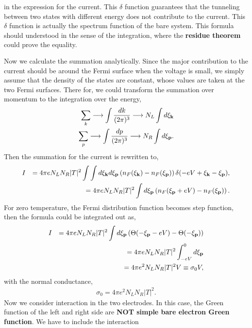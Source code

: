 \documentclass[11pt]{article}
\begin{document}
in the expression for the current. This \(\delta\) function guarantees
that the tunneling between two states with different energy does not
contribute to the current. This \(\delta\) function is actually the
spectrum function of the bare system. This formula should understood in
the sense of the integration, where the \textbf{residue theorem} could
prove the equality.

    Now we calculate the summation analytically. Since the major
contribution to the current should be around the Fermi surface when the
voltage is small, we simply assume that the density of the states are
constant, whose values are taken at the two Fermi surfaces. There for,
we could transform the summation over momentum to the integration over
the energy, \begin{eqnarray}
\sum_{k} \longrightarrow \int \frac{dk}{(2\pi)^3} \longrightarrow  N_L \int d \xi_{\bf k}
\\\nonumber
\sum_{p} \longrightarrow  \int \frac{dp}{(2\pi)^3} \longrightarrow  N_R \int d \xi_{\bf p}.
\end{eqnarray} Then the summation for the current is rewritten to,
\begin{eqnarray}
I && = 4 \pi e N_L N_R |T|^2  \int \int  d \xi_{\bf k} d \xi_{\bf p}    \left( n_F(\xi_{\bf k})- n_F(\xi_{\bf p}) \right)  \delta(-eV   +\xi_{\bf k} -\xi_{\bf p}),
\nonumber\\
&& = 4 \pi e N_L N_R |T|^2  \int d \xi_{\bf p}  \left( n_F(\xi_{\bf p} + eV)- n_F(\xi_{\bf p}) \right).
\end{eqnarray} For zero temperature, the Fermi distribution function
becomes step function, then the formula could be integrated out as,
\begin{eqnarray}
I && = 4 \pi e N_L N_R |T|^2  \int   d \xi_{\bf p}  \left( \Theta(-\xi_{\bf p} - eV) - \Theta (-\xi_{\bf p}) \right)
\\\nonumber
&& = 4 \pi e N_L N_R |T|^2  \int_{-eV}^0   d \xi_{\bf p} 
\\\nonumber
&& = 4 \pi e^2 N_L N_R |T|^2 V \equiv \sigma_0 V,
\end{eqnarray} with the normal conductance, \begin{eqnarray}
 \sigma_0 =4 \pi e^2 N_L N_R |T|^2.
\end{eqnarray} Now we consider interaction in the two electrodes. In
this case, the Green function of the left and right side are \textbf{NOT
simple bare electron Green function}. We have to include the interaction
\end{document}
